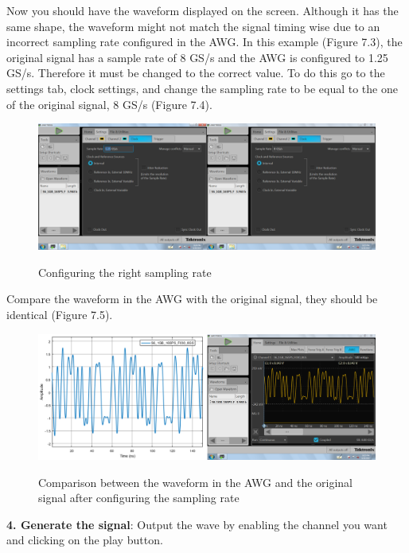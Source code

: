 Now you should have the waveform displayed on the screen. Although it has the same shape,  the waveform might not match the signal timing wise due to an incorrect sampling rate  configured in the AWG.
In this example (Figure 7.3), the original signal has a sample rate of 8 GS/s and the AWG is configured to 1.25 GS/s. Therefore it must be changed to the correct value.
To do this go to the settings tab, clock settings, and change the sampling rate to be equal to the one of the original signal, 8 GS/s (Figure 7.4).



\begin{figure}[h]
	\centering
	\includegraphics[width=\textwidth]{../mtools/sgnToWfm/figures/tutorial3}
	\label{TUT_ConfigSR}\caption{Configuring the right sampling rate}
\end{figure}

Compare the waveform in the AWG with the original signal, they should be identical (Figure 7.5).
\begin{figure}[h]
	\centering
	\includegraphics[width=\textwidth]{../mtools/sgnToWfm/figures/tutorial4}
	\label{TUT_CompGood}\caption{Comparison between the waveform in the AWG and the original signal after configuring the sampling rate}
\end{figure}

\noindent
\textbf{4. Generate the signal}:
Output the wave by enabling the channel you want and clicking on the play button.


% 